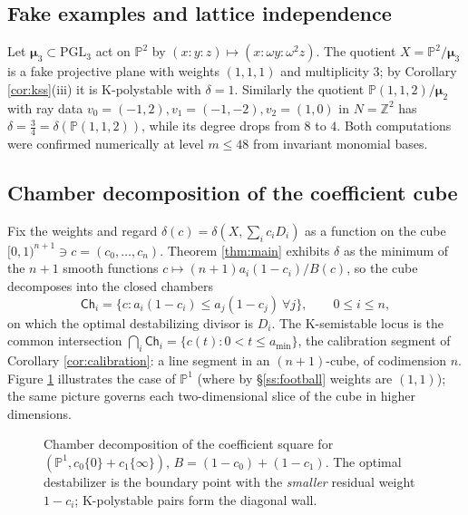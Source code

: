 \documentclass[11pt]{amsart}
\theoremstyle{definition}
\theoremstyle{remark}
\newcommand{\Z}{\mathbb{Z}}
\newcommand{\PP}{\mathbb{P}}
\newcommand{\bmu}{\boldsymbol{\mu}}
\begin{document}
\subsection{Fake examples and lattice independence}\label{ss:fake}
Let \(\bmu_3\subset\mathrm{PGL}_3\) act on \(\PP^2\) by
\((x:y:z)\mapsto(x:\omega y:\omega^2z)\). The quotient
\(X=\PP^2/\bmu_3\) is a fake projective plane with weights \((1,1,1)\)
and multiplicity \(3\); by Corollary \ref{cor:kss}(iii) it is
K-polystable with \(\delta=1\). Similarly the quotient
\(\PP(1,1,2)/\bmu_2\) with ray data
\(v_0=(-1,2),v_1=(-1,-2),v_2=(1,0)\) in \(N=\Z^2\) has
\(\delta=\tfrac34=\delta(\PP(1,1,2))\), while its degree drops from
\(8\) to \(4\). Both computations were confirmed numerically at level
\(m\le48\) from invariant monomial bases.

\subsection{Chamber decomposition of the coefficient cube}
\label{ss:chambers}
Fix the weights and regard
\(\delta(c)=\delta(X,\textstyle\sum_ic_iD_i)\) as a function on the cube
\([0,1)^{n+1}\ni c=(c_0,\dots,c_n)\). Theorem \ref{thm:main} exhibits
\(\delta\) as the minimum of the \(n+1\) smooth functions
\(c\mapsto (n+1)a_i(1-c_i)/B(c)\), so the cube decomposes into the
closed chambers
\[
\mathsf{Ch}_i=\bigl\{c : a_i(1-c_i)\le a_j(1-c_j)\ \forall j\bigr\},
\qquad 0\le i\le n,
\]
on which the optimal destabilizing divisor is \(D_i\). The K-semistable
locus is the common intersection
\(\bigcap_i\mathsf{Ch}_i=\{c(t):0<t\le a_{\min}\}\), the calibration
segment of Corollary \ref{cor:calibration}: a line segment in an
\((n+1)\)-cube, of codimension \(n\). Figure \ref{fig:chambers}
illustrates the case of \(\PP^1\) (where by \S\ref{ss:football} weights
are \((1,1)\)); the same picture governs each two-dimensional slice of
the cube in higher dimensions.

\begin{figure}[ht]
\centering
{}
\caption{Chamber decomposition of the coefficient square for
\((\PP^1,c_0\{0\}+c_1\{\infty\})\), \(B=(1-c_0)+(1-c_1)\). The optimal
destabilizer is the boundary point with the \emph{smaller} residual
weight \(1-c_i\); K-polystable pairs form the diagonal wall.}
\label{fig:chambers}
\end{figure}
\end{document}
